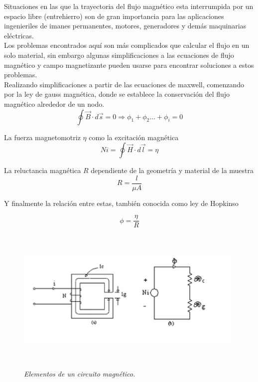 Situaciones en las que la trayectoria del flujo magnético esta interrumpida por un espacio libre (entrehierro) son de gran importancia para las aplicaciones ingenieriles de imanes permanentes, motores, generadores y demás maquinarias eléctricas. \\
Los problemas encontrados aquí son más complicados que  calcular el flujo en un solo material, sin embargo algunas simplificaciones a las ecuaciones de flujo magnético y campo magnetizante pueden usarse para encontrar soluciones a estos problemas.\\
Realizando simplificaciones a partir de las ecuaciones de maxwell, comenzando por la ley de gauss magnética, donde se establece la conservación del flujo magnético alrededor de un nodo.\\
\begin{equation}
	 \oint {\overrightarrow{B} \cdot d \overrightarrow{s}} = 0 \Rightarrow \phi_1 +\phi_2 ... + \phi_i = 0
\end{equation}

La fuerza magnetomotriz $\eta$ como la excitación magnética
\begin{equation}
	Ni = \oint {\overrightarrow{H} \cdot d \overrightarrow{l} = \eta}
\end{equation}

La reluctancia magnética $R$ dependiente de la geometría y material de la muestra
\begin{equation}
	R = \frac{l}{\mu A}
\end{equation}

Y finalmente la relación entre estas, también conocida como ley de Hopkinso

\begin{equation}
	\phi = \frac{\eta}{R}
\end{equation}

\begin{figure}[htb]
\begin{center}
\centering
	\includegraphics[width=11cm, height=7cm]{images/Capitulo_1/Elementos_de_un_circuito_magnetico}
	\caption{\textit{Elementos de un circuito magnético.}}
	\label{fig:system:example1}	
\end{center}
\end{figure}

